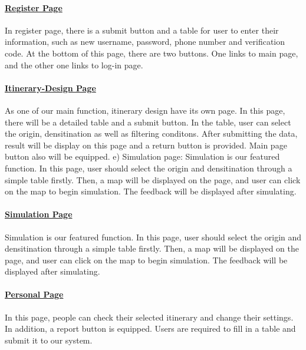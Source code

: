 \documentclass[10pt]{article}
\begin{document}
\paragraph{\underline{Register Page}}
In register page, there is a submit button and a table for user to enter their information, such as new username, password, phone number and verification code. At the bottom of this page, there are two buttons. One links to main page, and the other one links to log-in page.

\paragraph{\underline{Itinerary-Design Page}}
As one of our main function, itinerary design have its own page. In this page, there will be a detailed table and a submit button. In the table, user can select the origin, densitination as well as filtering conditons. After submitting the data, result will be display on this page and a return button is provided. Main page button also will be equipped.
e)	Simulation page: Simulation is our featured function. In this page, user should select the origin and densitination through a simple table firstly. Then, a map will be displayed on the page, and user can click on the map to begin simulation. The feedback will be displayed after simulating.

\paragraph{\underline{Simulation Page}}
Simulation is our featured function. In this page, user should select the origin and densitination through a simple table firstly. Then, a map will be displayed on the page, and user can click on the map to begin simulation. The feedback will be displayed after simulating.

\paragraph{\underline{Personal Page}}
In this page, people can check their selected itinerary and change their settings. In addition, a report button is equipped. Users are required to fill in a table and submit it to our system.
\end{document}
